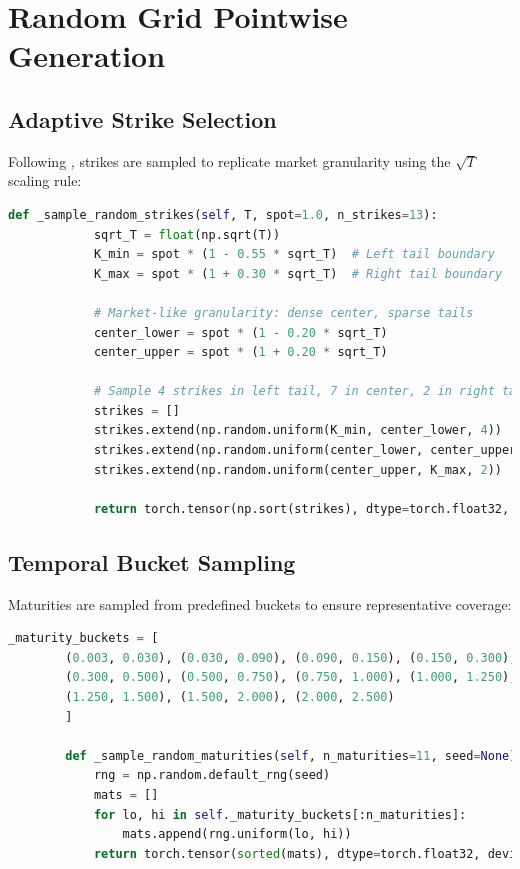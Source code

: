 	\section{Random Grid Pointwise Generation}\label{sec:random_grid}
	
	\subsection{Adaptive Strike Selection}
	
	Following \citet{Baschetti2024DeepCalibrationRandomGrids}, strikes are sampled to replicate market granularity using the $\sqrt{T}$ scaling rule:
	
	\begin{lstlisting}[language=Python, basicstyle=\ttfamily\footnotesize, 
		frame=single, rulecolor=\color{black!20}, backgroundcolor=\color{gray!5},
		showstringspaces=false, breaklines=true, columns=fullflexible]
		def _sample_random_strikes(self, T, spot=1.0, n_strikes=13):
			sqrt_T = float(np.sqrt(T))
			K_min = spot * (1 - 0.55 * sqrt_T)  # Left tail boundary
			K_max = spot * (1 + 0.30 * sqrt_T)  # Right tail boundary
		
			# Market-like granularity: dense center, sparse tails
			center_lower = spot * (1 - 0.20 * sqrt_T)
			center_upper = spot * (1 + 0.20 * sqrt_T)
		
			# Sample 4 strikes in left tail, 7 in center, 2 in right tail
			strikes = []
			strikes.extend(np.random.uniform(K_min, center_lower, 4))
			strikes.extend(np.random.uniform(center_lower, center_upper, 7))
			strikes.extend(np.random.uniform(center_upper, K_max, 2))
		
			return torch.tensor(np.sort(strikes), dtype=torch.float32, device=self.device)
	\end{lstlisting}
	
	\subsection{Temporal Bucket Sampling}
	
	Maturities are sampled from predefined buckets to ensure representative coverage:
	
	\begin{lstlisting}[language=Python, basicstyle=\ttfamily\footnotesize, 
		frame=single, rulecolor=\color{black!20}, backgroundcolor=\color{gray!5},
		showstringspaces=false, breaklines=true, columns=fullflexible]
		_maturity_buckets = [
		(0.003, 0.030), (0.030, 0.090), (0.090, 0.150), (0.150, 0.300),
		(0.300, 0.500), (0.500, 0.750), (0.750, 1.000), (1.000, 1.250),
		(1.250, 1.500), (1.500, 2.000), (2.000, 2.500)
		]
		
		def _sample_random_maturities(self, n_maturities=11, seed=None):
			rng = np.random.default_rng(seed)
			mats = []
			for lo, hi in self._maturity_buckets[:n_maturities]:
				mats.append(rng.uniform(lo, hi))
			return torch.tensor(sorted(mats), dtype=torch.float32, device=self.device)
	\end{lstlisting}
	
